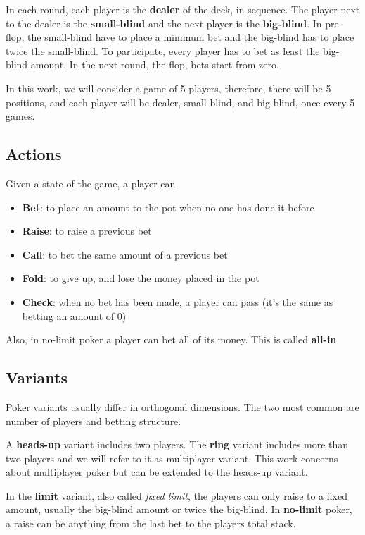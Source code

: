 In each round, each player is the \textbf{dealer} of the deck, in sequence. The player next to the dealer is the \textbf{small-blind} and the next player is the \textbf{big-blind}. In pre-flop, the small-blind have to place a minimum bet and the big-blind has to place twice the small-blind. To participate, every player has to bet as least the big-blind amount. In the next round, the flop, bets start from zero.

In this work, we will consider a game of 5 players, therefore, there will be 5 positions, and each player will be dealer, small-blind, and big-blind, once every 5 games.

\subsection{Actions}

Given a state of the game, a player can

\begin{itemize}
  \item \textbf{Bet}: to place an amount to the pot when no one has done it before
  \item \textbf{Raise}: to raise a previous bet
  \item \textbf{Call}: to bet the same amount of a previous bet
  \item \textbf{Fold}: to give up, and lose the money placed in the pot
  \item \textbf{Check}: when no bet has been made, a player can pass (it's the same as betting an amount of 0)
\end{itemize}

Also, in no-limit poker a player can bet all of its money. This is called \textbf{all-in}

\subsection{Variants}
Poker variants usually differ in orthogonal dimensions. The two most common are number of players and betting structure.

A \textbf{heads-up} variant includes two players. The \textbf{ring} variant includes more than two players and we will refer to it as multiplayer variant. This work concerns about multiplayer poker but can be extended to the heads-up variant.

In the \textbf{limit} variant, also called \textit{fixed limit}, the players can only raise to a fixed amount, usually the big-blind amount or twice the big-blind. In \textbf{no-limit} poker, a raise can be anything from the last bet to the players total stack.

